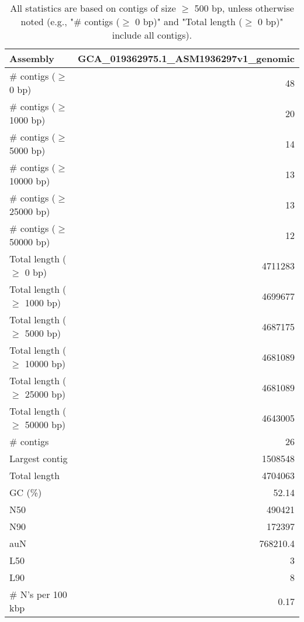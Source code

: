 \documentclass[12pt,a4paper]{article}
\begin{document}
\begin{table}[ht]
\begin{center}
\caption{All statistics are based on contigs of size $\geq$ 500 bp, unless otherwise noted (e.g., "\# contigs ($\geq$ 0 bp)" and "Total length ($\geq$ 0 bp)" include all contigs).}
\begin{tabular}{|l*{1}{|r}|}
\hline
Assembly & GCA\_019362975.1\_ASM1936297v1\_genomic \\ \hline
\# contigs ($\geq$ 0 bp) & 48 \\ \hline
\# contigs ($\geq$ 1000 bp) & 20 \\ \hline
\# contigs ($\geq$ 5000 bp) & 14 \\ \hline
\# contigs ($\geq$ 10000 bp) & 13 \\ \hline
\# contigs ($\geq$ 25000 bp) & 13 \\ \hline
\# contigs ($\geq$ 50000 bp) & 12 \\ \hline
Total length ($\geq$ 0 bp) & 4711283 \\ \hline
Total length ($\geq$ 1000 bp) & 4699677 \\ \hline
Total length ($\geq$ 5000 bp) & 4687175 \\ \hline
Total length ($\geq$ 10000 bp) & 4681089 \\ \hline
Total length ($\geq$ 25000 bp) & 4681089 \\ \hline
Total length ($\geq$ 50000 bp) & 4643005 \\ \hline
\# contigs & 26 \\ \hline
Largest contig & 1508548 \\ \hline
Total length & 4704063 \\ \hline
GC (\%) & 52.14 \\ \hline
N50 & 490421 \\ \hline
N90 & 172397 \\ \hline
auN & 768210.4 \\ \hline
L50 & 3 \\ \hline
L90 & 8 \\ \hline
\# N's per 100 kbp & 0.17 \\ \hline
\end{tabular}
\end{center}
\end{table}
\end{document}
